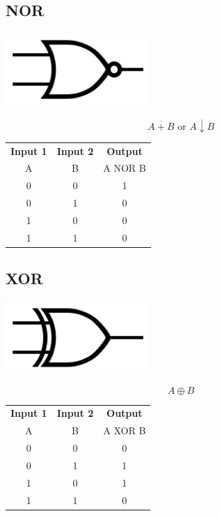 \documentclass[11pt]{book}
\begin{document}
\newpage

\subsection{NOR}
\begin{center}
	\includegraphics{figures/20.05.png}
\end{center}
\begin{equation}
	\overline{A+B} \text{ or } A \downarrow B
\end{equation}
\begin{center}
	\begin{tabular}{c c c}
		\textbf{Input 1} &  \textbf{Input 2} & \textbf{Output} \\
		A & B & A NOR B \\
		0 & 0 & 1 \\
		0 & 1 & 0 \\
		1 & 0 & 0 \\
		1 & 1 & 0
	\end{tabular}
\end{center}

\subsection{XOR}
\begin{center}
	\includegraphics{figures/20.06.png}
\end{center}
\begin{equation}
	A \oplus B
\end{equation}
\begin{center}
	\begin{tabular}{c c c}
		\textbf{Input 1} &  \textbf{Input 2} & \textbf{Output} \\
		A & B & A XOR B \\
		0 & 0 & 0 \\
		0 & 1 & 1 \\
		1 & 0 & 1 \\
		1 & 1 & 0
	\end{tabular}
\end{center}
\end{document}

